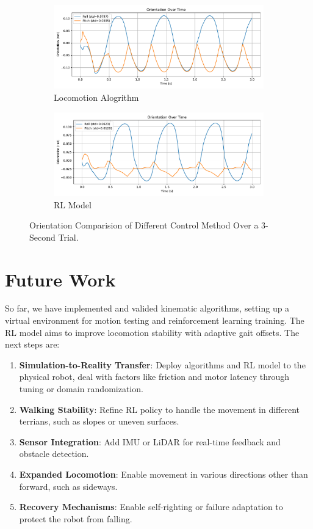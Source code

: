 \documentclass[a4paper,11pt]{article}
\begin{document}
\begin{figure}[H]
  \centering
  \begin{subfigure}[b]{\textwidth}
    \includegraphics[width=0.9\linewidth]{../../assets/alg_ori.pdf}
    \caption{Locomotion Alogrithm}
  \end{subfigure}
  \hfill
  \begin{subfigure}[b]{\textwidth}
    \includegraphics[width=0.9\linewidth]{../../assets/model_ori.pdf}
    \caption{RL Model}
  \end{subfigure}
  \caption{Orientation Comparision of Different Control Method Over a 3-Second Trial.}
  \label{fig:compare_ori}
\end{figure}

\section{Future Work}

So far, we have implemented and valided kinematic algorithms, 
setting up a virtual environment for motion testing and reinforcement 
learning training. The RL model aims to improve locomotion stability with 
adaptive gait offsets. The next steps are:

\begin{enumerate}
	\item \textbf{Simulation-to-Reality Transfer}: Deploy algorithms and RL model to the physical robot, deal with factors like friction and motor latency through tuning or domain randomization.
	\item \textbf{Walking Stability}: Refine RL policy to handle the movement in different terrians, such as slopes or uneven surfaces.
	\item \textbf{Sensor Integration}: Add IMU or LiDAR for real-time feedback and obstacle detection.
	\item \textbf{Expanded Locomotion}: Enable movement in various directions other than forward, such as sideways.
	\item \textbf{Recovery Mechanisms}: Enable self-righting or failure adaptation to protect the robot from falling.
\end{enumerate}
\end{document}

